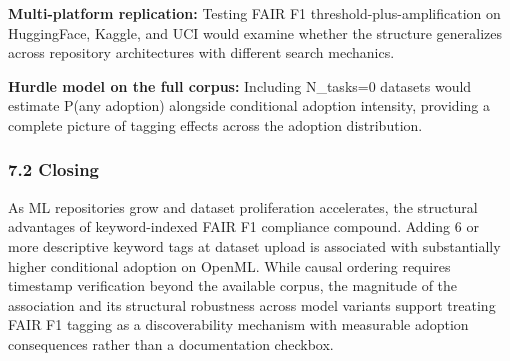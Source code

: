 \textbf{Multi-platform replication:} Testing FAIR F1 threshold-plus-amplification on HuggingFace, Kaggle, and UCI would examine whether the structure generalizes across repository architectures with different search mechanics.

\textbf{Hurdle model on the full corpus:} Including N\_tasks=0 datasets would estimate P(any adoption) alongside conditional adoption intensity, providing a complete picture of tagging effects across the adoption distribution.

\subsubsection{7.2 Closing}

As ML repositories grow and dataset proliferation accelerates, the structural advantages of keyword-indexed FAIR F1 compliance compound. Adding 6 or more descriptive keyword tags at dataset upload is associated with substantially higher conditional adoption on OpenML. While causal ordering requires timestamp verification beyond the available corpus, the magnitude of the association and its structural robustness across model variants support treating FAIR F1 tagging as a discoverability mechanism with measurable adoption consequences rather than a documentation checkbox.

